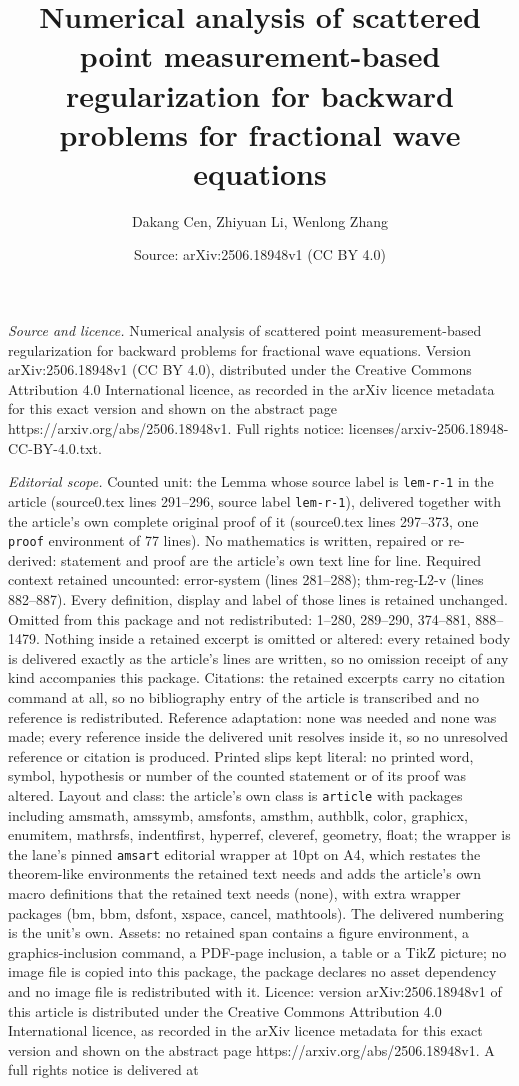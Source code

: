\documentclass[10pt,a4paper]{amsart}
\title[Numerical analysis of scattered point measurement-based regu]{Numerical analysis of scattered point measurement-based regularization for backward problems for fractional wave equations}
\author{Dakang Cen, Zhiyuan Li, Wenlong Zhang}
\date{Source: arXiv:2506.18948v1 (CC BY 4.0)}
\begin{document}
\maketitle

\noindent\emph{Source and licence.} Numerical analysis of scattered point measurement-based regularization for backward problems for fractional wave equations. Version arXiv:2506.18948v1 (CC BY 4.0), distributed under the Creative Commons Attribution 4.0 International licence, as recorded in the arXiv licence metadata for this exact version and shown on the abstract page https://arxiv.org/abs/2506.18948v1. Full rights notice: licenses/arxiv-2506.18948-CC-BY-4.0.txt.\par\smallskip

\noindent\textit{Editorial scope.} Counted unit: the Lemma whose source label is \texttt{lem-r-1} in the article (source0.tex lines 291--296, source label \texttt{lem-r-1}), delivered together with the article's own complete original proof of it (source0.tex lines 297--373, one \texttt{proof} environment of 77 lines). No mathematics is written, repaired or re-derived: statement and proof are the article's own text line for line. Required context retained uncounted: error-system (lines 281--288); thm-reg-L2-v (lines 882--887). Every definition, display and label of those lines is retained unchanged. Omitted from this package and not redistributed: 1--280, 289--290, 374--881, 888--1479. Nothing inside a retained excerpt is omitted or altered: every retained body is delivered exactly as the article's lines are written, so no omission receipt of any kind accompanies this package. Citations: the retained excerpts carry no citation command at all, so no bibliography entry of the article is transcribed and no reference is redistributed. Reference adaptation: none was needed and none was made; every reference inside the delivered unit resolves inside it, so no unresolved reference or citation is produced. Printed slips kept literal: no printed word, symbol, hypothesis or number of the counted statement or of its proof was altered. Layout and class: the article's own class is \texttt{article} with packages including amsmath, amssymb, amsfonts, amsthm, authblk, color, graphicx, enumitem, mathrsfs, indentfirst, hyperref, cleveref, geometry, float; the wrapper is the lane's pinned \texttt{amsart} editorial wrapper at 10pt on A4, which restates the theorem-like environments the retained text needs and adds the article's own macro definitions that the retained text needs (none), with extra wrapper packages (bm, bbm, dsfont, xspace, cancel, mathtools). The delivered numbering is the unit's own. Assets: no retained span contains a figure environment, a graphics-inclusion command, a PDF-page inclusion, a table or a TikZ picture; no image file is copied into this package, the package declares no asset dependency and no image file is redistributed with it. Licence: version arXiv:2506.18948v1 of this article is distributed under the Creative Commons Attribution 4.0 International licence, as recorded in the arXiv licence metadata for this exact version and shown on the abstract page https://arxiv.org/abs/2506.18948v1. A full rights notice is delivered at 
\end{document}
